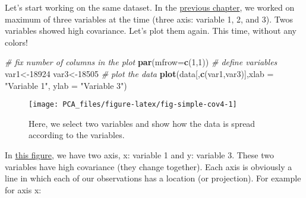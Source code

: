 \documentclass[
]{book}
\newenvironment{Shaded}{\begin{snugshade}}{\end{snugshade}}
\newcommand{\CommentTok}[1]{\textcolor[rgb]{0.56,0.35,0.01}{\textit{#1}}}
\newcommand{\DataTypeTok}[1]{\textcolor[rgb]{0.13,0.29,0.53}{#1}}
\newcommand{\DecValTok}[1]{\textcolor[rgb]{0.00,0.00,0.81}{#1}}
\newcommand{\KeywordTok}[1]{\textcolor[rgb]{0.13,0.29,0.53}{\textbf{#1}}}
\newcommand{\NormalTok}[1]{#1}
\newcommand{\StringTok}[1]{\textcolor[rgb]{0.31,0.60,0.02}{#1}}
\theoremstyle{definition}
\theoremstyle{definition}
\theoremstyle{definition}
\theoremstyle{remark}
\begin{document}
Let's start working on the same dataset. In the \protect\hyperlink{intro}{previous chapter}, we worked on maximum of three variables at the time (three axis: variable 1, 2, and 3). Twos variables showed high covariance. Let's plot them again. This time, without any colors!

\begin{Shaded}
\begin{Highlighting}[]
\CommentTok{# fix number of columns in the plot}
\KeywordTok{par}\NormalTok{(}\DataTypeTok{mfrow=}\KeywordTok{c}\NormalTok{(}\DecValTok{1}\NormalTok{,}\DecValTok{1}\NormalTok{))}
\CommentTok{# define variables}
\NormalTok{var1<-}\DecValTok{18924}
\NormalTok{var3<-}\DecValTok{18505}
\CommentTok{# plot the data}
\KeywordTok{plot}\NormalTok{(data[,}\KeywordTok{c}\NormalTok{(var1,var3)],}\DataTypeTok{xlab =} \StringTok{"Variable 1"}\NormalTok{, }\DataTypeTok{ylab =} \StringTok{"Variable 3"}\NormalTok{)}
\end{Highlighting}
\end{Shaded}

\begin{figure}

{\centering \texttt{[image: PCA\_files/figure-latex/fig-simple-cov4-1]} 

}

\caption{Here, we select two variables and show how the data is spread according to the variables.}\label{fig:fig-simple-cov4}
\end{figure}

In \protect\hyperlink{fig-simple-cov4}{this figure}, we have two axis, x: variable 1 and y: variable 3. These two variables have high covariance (they change together). Each axis is obviously a line in which each of our observations has a location (or projection). For example for axis x:
\end{document}
